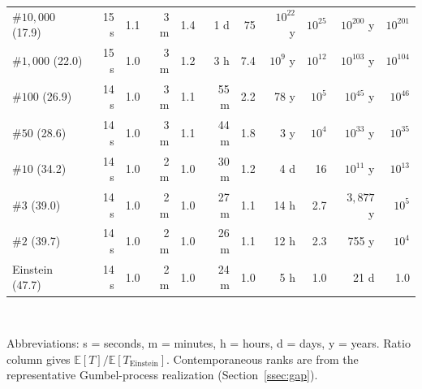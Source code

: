 \documentclass{article}
\begin{document}
\begin{table}[ht]
\begin{tabular}{l r r r r r r r r r r}
    \hline
    $\#10{,}000$ (17.9)
    & 15 s & 1.1
    & 3 m & 1.4
    & 1 d & 75
    & $10^{22}$ y & $10^{25}$
    & $10^{200}$ y & $10^{201}$ \\
    $\#1{,}000$ (22.0)
    & 15 s & 1.0
    & 3 m & 1.2
    & 3 h & 7.4
    & $10^{9}$ y & $10^{12}$
    & $10^{103}$ y & $10^{104}$ \\
    $\#100$ (26.9)
    & 14 s & 1.0
    & 3 m & 1.1
    & 55 m & 2.2
    & 78 y & $10^{5}$
    & $10^{45}$ y & $10^{46}$ \\
    $\#50$ (28.6)
    & 14 s & 1.0
    & 3 m & 1.1
    & 44 m & 1.8
    & 3 y & $10^{4}$
    & $10^{33}$ y & $10^{35}$ \\
    $\#10$ (34.2)
    & 14 s & 1.0
    & 2 m & 1.0
    & 30 m & 1.2
    & 4 d & 16
    & $10^{11}$ y & $10^{13}$ \\
    $\#3$ (39.0)
    & 14 s & 1.0
    & 2 m & 1.0
    & 27 m & 1.1
    & 14 h & 2.7
    & $3{,}877$ y & $10^{5}$ \\
    $\#2$ (39.7)
    & 14 s & 1.0
    & 2 m & 1.0
    & 26 m & 1.1
    & 12 h & 2.3
    & 755 y & $10^{4}$ \\
    \hline
    Einstein (47.7)
    & 14 s & 1.0
    & 2 m & 1.0
    & 24 m & 1.0
    & 5 h & 1.0
    & 21 d & 1.0 \\
    \hline
  \end{tabular}
  \\[4pt]
  \raggedright\footnotesize
  Abbreviations: s = seconds, m = minutes, h = hours, d = days, y = years.
  Ratio column gives $\mathbb{E}[T]/\mathbb{E}[T_{\mathrm{Einstein}}]$.
  Contemporaneous ranks are from the representative Gumbel-process
  realization (Section~\ref{ssec:gap}).
\end{table}
\end{document}
